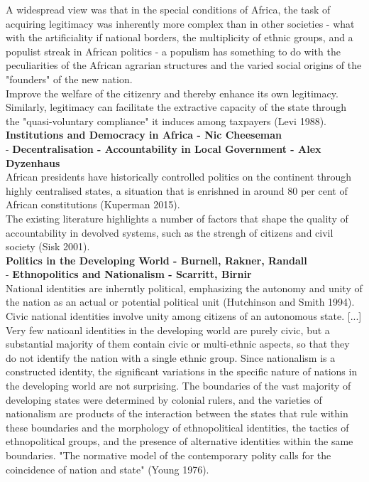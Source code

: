 \documentclass[11pt]{article}
\theoremstyle{plain}
\theoremstyle{plain}
\begin{document}
A widespread view was that in the special conditions of Africa, the task of acquiring legitimacy was inherently more complex than in other societies - what with the artificiality if national borders, the multiplicity of ethnic groups, and a populist streak in African politics -  a populism has something to do with the peculiarities of the African agrarian structures and the varied social origins of the "founders" of the new nation.\\

Improve the welfare of the citizenry and thereby enhance its own legitimacy. Similarly, legitimacy can facilitate the extractive capacity of the state through the "quasi-voluntary compliance" it induces among taxpayers (Levi 1988).\\

\textbf{Institutions and Democracy in Africa - Nic Cheeseman}\\
- \textbf{Decentralisation - Accountability in Local Government - Alex Dyzenhaus}\\

African presidents have historically controlled politics on the continent through highly centralised states, a situation that is enrishned in around 80 per cent of African constitutions (Kuperman 2015).\\
The existing literature highlights a number of factors that shape the quality of accountability in devolved systems, such as the strengh of citizens and civil society (Sisk 2001).\\

\textbf{Politics in the Developing World - Burnell, Rakner, Randall}\\
- \textbf{Ethnopolitics and Nationalism - Scarritt, Birnir}\\

National identities are inherntly political, emphasizing the autonomy and unity of the nation as an actual or potential political unit (Hutchinson and Smith 1994). Civic national identities involve unity among citizens of an autonomous state. [...] Very few natioanl identities in the developing world are purely civic, but a substantial majority of them contain civic or multi-ethnic aspects, so that they do not identify the nation with a single ethnic group. Since nationalism is a constructed identity, the significant variations in the specific nature of nations in the developing world are not surprising. The boundaries of the vast majority of developing states were determined by colonial rulers, and the varieties of nationalism are products of the interaction between the states that rule within these boundaries and the morphology of ethnopolitical identities, the tactics of ethnopolitical groups, and the presence of alternative identities within the same boundaries. "The normative model of the contemporary polity calls for the coincidence of nation and state" (Young 1976).\\
\end{document}
